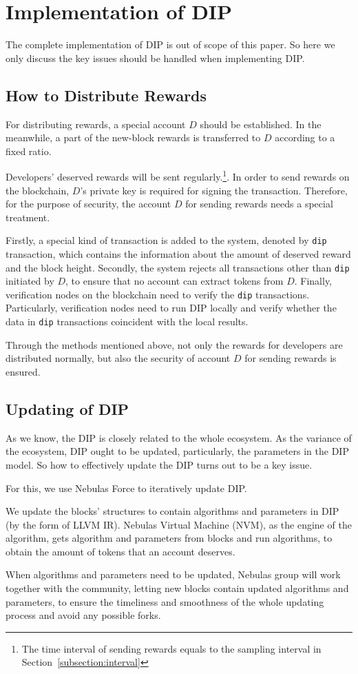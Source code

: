 \section{Implementation of DIP}
\noindent
The complete implementation of DIP is out of scope of this paper. So here we only discuss the key issues should be handled when implementing DIP\@.

\subsection{How to Distribute Rewards}
\noindent
For distributing rewards, a special account $D$ should be established. In the meanwhile, a part of the new-block rewards is transferred to $D$ according to a fixed ratio.

Developers' deserved rewards will be sent regularly.\footnote{The time interval
of sending rewards equals to the sampling interval in
Section~\ref{subsection:interval}}. In order to send rewards on the blockchain,
$D$'s private key is required for signing the transaction. Therefore, for the purpose of security, the account $D$ for sending rewards needs a special treatment.

Firstly, a special kind of transaction is added to the system, denoted by
\texttt{dip} transaction, which contains the information about the amount of
deserved reward and the block height. Secondly, the system rejects all
transactions other than \texttt{dip} initiated by $D$, to ensure that no
account can extract tokens from $D$. Finally, verification nodes on the
blockchain  need to verify the \texttt{dip} transactions. Particularly,
verification nodes need to run DIP locally and verify whether the data in
\texttt{dip} transactions coincident with the local results.

Through the methods mentioned above, not only the rewards for developers are distributed normally, but also the security of account $D$ for sending rewards is ensured.

\subsection{Updating of DIP}
\noindent
As we know, the DIP is closely related to the whole ecosystem. As the variance
of the ecosystem, DIP ought to be updated, particularly, the parameters in the
DIP model. So how to effectively update the DIP turns out to be a key issue.

For this, we use Nebulas Force to iteratively update DIP\@.

We update the blocks' structures to contain algorithms and parameters in DIP (by the form of LLVM IR). Nebulas Virtual Machine (NVM), as the engine of the algorithm, gets algorithm and parameters from blocks and run algorithms, to obtain the amount of tokens that an account deserves.

When algorithms and parameters need to be updated, Nebulas group will work
together with the community, letting new blocks contain updated algorithms and parameters, to ensure the timeliness and smoothness of the whole updating process and avoid any possible forks.
